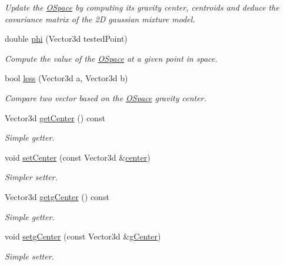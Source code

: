 \begin{DoxyCompactItemize}
\begin{DoxyCompactList}\small\item\em Update the \hyperlink{classOSpace}{O\+Space} by computing its gravity center, centroids and deduce the covariance matrix of the 2D gaussian mixture model. \end{DoxyCompactList}\item 
double \hyperlink{classOSpace_afa5d22b357c9639c7208c1cb5c6525fa}{phi} (Vector3d tested\+Point)
\begin{DoxyCompactList}\small\item\em Compute the value of the \hyperlink{classOSpace}{O\+Space} at a given point in space. \end{DoxyCompactList}\item 
bool \hyperlink{classOSpace_a96380f4ad674c9ecb29b345ff87d6b3f}{less} (Vector3d a, Vector3d b)
\begin{DoxyCompactList}\small\item\em Compare two vector based on the \hyperlink{classOSpace}{O\+Space} gravity center. \end{DoxyCompactList}\item 
Vector3d \hyperlink{classOSpace_ab9ddbaab88efeab63fb7e0e51de55036}{get\+Center} () const 
\begin{DoxyCompactList}\small\item\em Simple getter. \end{DoxyCompactList}\item 
void \hyperlink{classOSpace_aa495172e001ca1c6d5dd169f4cd4900b}{set\+Center} (const Vector3d \&\hyperlink{classOSpace_a7ec22529d88e51876ff7eba9cdcdca05}{center})
\begin{DoxyCompactList}\small\item\em Simpler setter. \end{DoxyCompactList}\item 
Vector3d \hyperlink{classOSpace_a45e9ea9c566d2fc13713a5092ce841f6}{getg\+Center} () const 
\begin{DoxyCompactList}\small\item\em Simple getter. \end{DoxyCompactList}\item 
void \hyperlink{classOSpace_aa4bbf797dfce6bd4414d33a57b346ea3}{setg\+Center} (const Vector3d \&\hyperlink{classOSpace_a023a293d79b949534f94eedbac932cec}{g\+Center})
\begin{DoxyCompactList}\small\item\em Simple setter. \end{DoxyCompactList}\end{DoxyCompactItemize}
